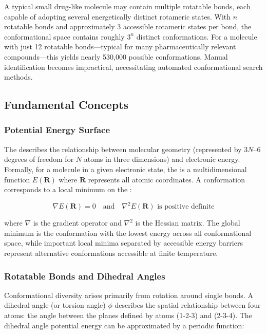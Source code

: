 \documentclass[12pt]{article}
\begin{document}
A typical small drug-like molecule may contain multiple rotatable bonds, each capable of adopting several energetically distinct rotameric states. With $n$ rotatable bonds and approximately 3 accessible rotameric states per bond, the conformational space contains roughly $3^n$ distinct conformations. For a molecule with just 12 rotatable bonds---typical for many pharmaceutically relevant compounds---this yields nearly 530,000 possible conformations. Manual identification becomes impractical, necessitating automated conformational search methods.

\subsection{Fundamental Concepts}

\subsubsection{Potential Energy Surface}

The \PES describes the relationship between molecular geometry (represented by 3$N$--6 degrees of freedom for $N$ atoms in three dimensions) and electronic energy. Formally, for a molecule in a given electronic state, the \PES is a multidimensional function \(E(\mathbf{R})\) where $\mathbf{R}$ represents all atomic coordinates. A conformation corresponds to a local minimum on the \PES:

\begin{equation}
\nabla E(\mathbf{R}) = 0 \quad \text{and} \quad \nabla^2 E(\mathbf{R}) \text{ is positive definite}
\label{eq:local_minimum}
\end{equation}

where $\nabla$ is the gradient operator and $\nabla^2$ is the Hessian matrix. The global minimum is the conformation with the lowest energy across all conformational space, while important local minima separated by accessible energy barriers represent alternative conformations accessible at finite temperature.

\subsubsection{Rotatable Bonds and Dihedral Angles}

Conformational diversity arises primarily from rotation around single bonds. A dihedral angle (or torsion angle) $\phi$ describes the spatial relationship between four atoms: the angle between the planes defined by atoms (1-2-3) and (2-3-4). The dihedral angle potential energy can be approximated by a periodic function:
\end{document}
